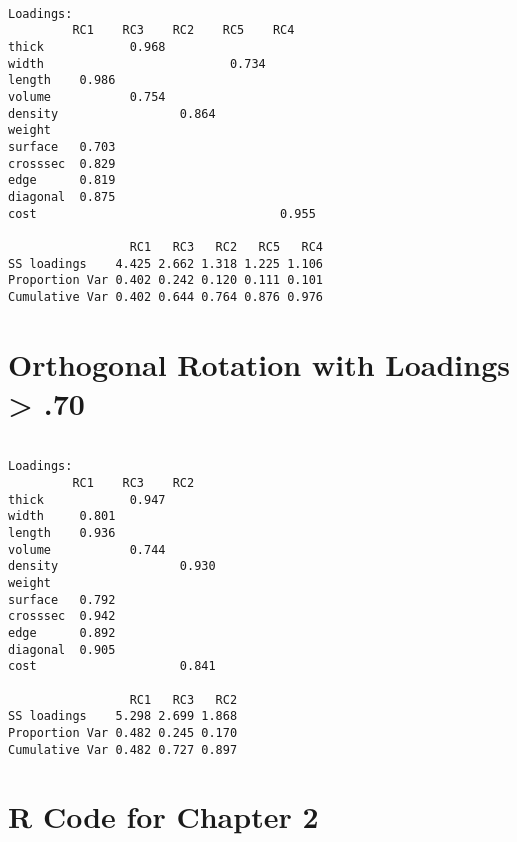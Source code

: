 \documentclass[
]{book}
\begin{document}
\footnotesize

\begin{verbatim}

Loadings:
         RC1    RC3    RC2    RC5    RC4   
thick            0.968                     
width                          0.734       
length    0.986                            
volume           0.754                     
density                 0.864              
weight                                     
surface   0.703                            
crosssec  0.829                            
edge      0.819                            
diagonal  0.875                            
cost                                  0.955

                 RC1   RC3   RC2   RC5   RC4
SS loadings    4.425 2.662 1.318 1.225 1.106
Proportion Var 0.402 0.242 0.120 0.111 0.101
Cumulative Var 0.402 0.644 0.764 0.876 0.976
\end{verbatim}

\hypertarget{orthogonal-rotation-with-loadings-.70}{%
\section{Orthogonal Rotation with Loadings \textgreater{} .70}\label{orthogonal-rotation-with-loadings-.70}}

\footnotesize

\begin{verbatim}

Loadings:
         RC1    RC3    RC2   
thick            0.947       
width     0.801              
length    0.936              
volume           0.744       
density                 0.930
weight                       
surface   0.792              
crosssec  0.942              
edge      0.892              
diagonal  0.905              
cost                    0.841

                 RC1   RC3   RC2
SS loadings    5.298 2.699 1.868
Proportion Var 0.482 0.245 0.170
Cumulative Var 0.482 0.727 0.897
\end{verbatim}

\hypertarget{r-code-for-chapter-2}{%
\section{R Code for Chapter 2}\label{r-code-for-chapter-2}}
\end{document}
